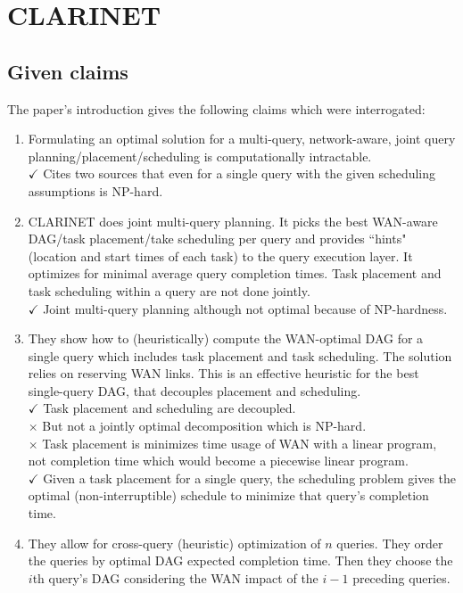 \section{CLARINET}

\subsection{Given claims}

The paper's introduction gives the following claims which were interrogated:

\begin{enumerate}
	\item Formulating an optimal solution for a multi-query, network-aware, joint query planning/placement/scheduling is computationally intractable. \\
	$\checkmark$ Cites two sources that even for a single query with the given scheduling assumptions is NP-hard.
	\item CLARINET does joint multi-query planning.
	It picks the best WAN-aware DAG/task placement/take scheduling per query and provides ``hints" (location and start times of each task) to the query execution layer.
	It optimizes for minimal average query completion times.
	Task placement and task scheduling within a query are not done jointly.\\
	$\checkmark$ Joint multi-query planning although not optimal because of NP-hardness.
	\item They show how to (heuristically) compute the WAN-optimal DAG for a single query which includes task placement and task scheduling.
	The solution relies on reserving WAN links.
	This is an effective heuristic for the best single-query DAG, that decouples placement and scheduling.\\
	$\checkmark$ Task placement and scheduling are decoupled.\\ 
	$\times$ But not a jointly optimal decomposition which is NP-hard. \\
	$\times$ Task placement is minimizes time usage of WAN with a linear program, not completion time which would become a piecewise linear program. \\
	$\checkmark$ Given a task placement for a single query, the scheduling problem gives the optimal (non-interruptible) schedule to minimize that query's completion time.
	\item They allow for cross-query (heuristic) optimization of $n$ queries.
	They order the queries by optimal DAG expected completion time.
	Then they choose the $i$th query's DAG considering the WAN impact of the $i-1$ preceding queries.

\end{enumerate}
